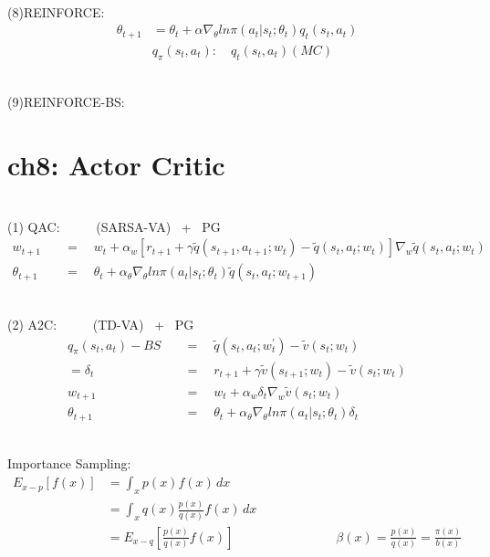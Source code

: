 \documentclass{article}
\begin{document}
~ \\[3pt]
(8)REINFORCE: 
\begin{align*}
    \theta_{t+1} &= \theta_{t} + \alpha \nabla_{\theta} 
                    ln \pi (a_{t} | s_{t}; \theta_{t}) q_{t} (s_{t}, a_{t}) \\[3pt]
    & q_{\pi} (s_{t}, a_{t}) : \quad q_{t} (s_{t}, a_{t}) (MC) 
\end{align*}


~ \\[3pt]
(9)REINFORCE-BS: 


\newpage
\section*{ch8: Actor Critic}


~ \\[3pt]
(1) QAC: \ \ \ \ \ {(SARSA-VA) \ + \ PG} 
\begin{align*}
    w_{t+1} & 
            \quad = \quad w_{t} + \alpha_{w} 
            [ r_{t+1} + \gamma \tilde{q}(s_{t+1}, a_{t+1}; w_{t}) 
            - \tilde{q}(s_{t}, a_{t}; w_{t}) ] 
            \nabla_{w} \tilde{q}(s_{t}, a_{t}; w_{t}) \\[3pt]
    \theta_{t+1} & 
            \quad = \quad \theta_{t} + \alpha_{\theta} \nabla_{\theta} 
            ln \pi (a_{t} | s_{t}; \theta_{t}) \tilde{q}(s_{t}, a_{t}; w_{t+1}) 
\end{align*}


~ \\[3pt]
(2) A2C: \ \ \ \ \ {(TD-VA) \ + \ PG} 
\begin{align*}
    q_{\pi}(s_{t}, a_{t}) - BS & 
            \quad = \quad 
            \tilde{q}(s_{t}, a_{t}; w_{t}^{'}) 
            - \tilde{v}(s_{t}; w_{t}) \\[3pt]
    = \delta_{t} & 
            \quad = \quad 
            r_{t+1} + \gamma \tilde{v}(s_{t+1}; w_{t}) 
            - \tilde{v}(s_{t}; w_{t}) \\[3pt]
    w_{t+1} & 
            \quad = \quad w_{t} + \alpha_{w} \delta_{t} 
            \nabla_{w} \tilde{v}(s_{t}; w_{t}) \\[3pt]
    \theta_{t+1} & 
            \quad = \quad \theta_{t} + \alpha_{\theta} \nabla_{\theta} 
            ln \pi (a_{t} | s_{t}; \theta_{t}) \delta_{t} 
\end{align*}


~ \\[3pt]
Importance Sampling: 
\begin{align*}
    E_{x-p} [f(x)] &= \int_{x} p(x) f(x) \,dx \\[3pt]
                   &= \int_{x} q(x) \frac{p(x)}{q(x)} f(x) \,dx \\[3pt]
                   &= E_{x-q} \left[ \frac{p(x)}{q(x)} f(x) \right] 
                   \qquad \qquad \qquad \qquad 
                   \beta(x) = \frac{p(x)}{q(x)} = \frac{\pi(x)}{b(x)} 
\end{align*}
\end{document}
